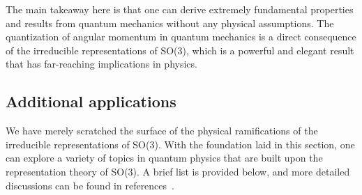 The main takeaway here is that one can derive extremely fundamental properties and results from quantum mechanics without any physical assumptions. The quantization of angular momentum in quantum mechanics is a direct consequence of the irreducible representations of SO(3), which is a powerful and elegant result that has far-reaching implications in physics.



\subsection{Additional applications}
We have merely scratched the surface of the physical ramifications of the irreducible representations of SO(3). With the foundation laid in this section, one can explore a variety of topics in quantum physics that are built upon the representation theory of SO(3). A brief list is provided below, and more detailed discussions can be found in references~\cite{Griffiths2018,Hall2013,Tung1985}.
